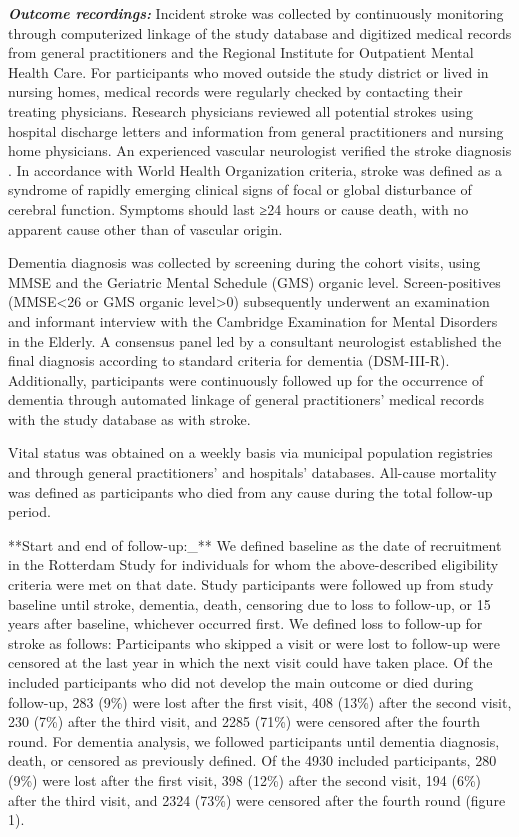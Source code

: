 \documentclass[
]{book}
\begin{document}
\textbf{\emph{Outcome recordings:}} Incident stroke was collected by continuously monitoring through computerized linkage of the study database and digitized medical records from general practitioners and the Regional Institute for Outpatient Mental Health Care. For participants who moved outside the study district or lived in nursing homes, medical records were regularly checked by contacting their treating physicians. Research physicians reviewed all potential strokes using hospital discharge letters and information from general practitioners and nursing home physicians. An experienced vascular neurologist verified the stroke diagnosis \autocite{wieberdink2012,akoudad2015}. In accordance with World Health Organization criteria, stroke was defined as a syndrome of rapidly emerging clinical signs of focal or global disturbance of cerebral function. Symptoms should last ≥24 hours or cause death, with no apparent cause other than of vascular origin.

Dementia diagnosis was collected by screening during the cohort visits, using MMSE and the Geriatric Mental Schedule (GMS) organic level. Screen-positives (MMSE\textless26 or GMS organic level\textgreater0) subsequently underwent an examination and informant interview with the Cambridge Examination for Mental Disorders in the Elderly. A consensus panel led by a consultant neurologist established the final diagnosis according to standard criteria for dementia (DSM-III-R). Additionally, participants were continuously followed up for the occurrence of dementia through automated linkage of general practitioners' medical records with the study database \autocite{debruijn2015,ott1999} as with stroke.

Vital status was obtained on a weekly basis via municipal population registries and through general practitioners' and hospitals' databases. All-cause mortality was defined as participants who died from any cause during the total follow-up period.

**Start and end of follow-up:\_** We defined baseline as the date of recruitment in the Rotterdam Study for individuals for whom the above-described eligibility criteria were met on that date. Study participants were followed up from study baseline until stroke, dementia, death, censoring due to loss to follow-up, or 15 years after baseline, whichever occurred first. We defined loss to follow-up for stroke as follows: Participants who skipped a visit or were lost to follow-up were censored at the last year in which the next visit could have taken place. Of the included participants who did not develop the main outcome or died during follow-up, 283 (9\%) were lost after the first visit, 408 (13\%) after the second visit, 230 (7\%) after the third visit, and 2285 (71\%) were censored after the fourth round. For dementia analysis, we followed participants until dementia diagnosis, death, or censored as previously defined. Of the 4930 included participants, 280 (9\%) were lost after the first visit, 398 (12\%) after the second visit, 194 (6\%) after the third visit, and 2324 (73\%) were censored after the fourth round (figure 1).
\end{document}

